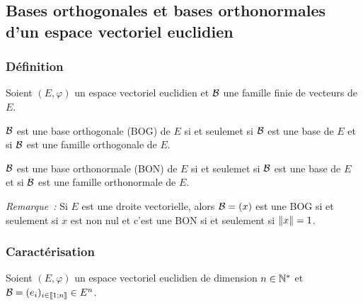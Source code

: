 \subsection{Bases orthogonales et bases orthonormales d'un espace vectoriel euclidien}

\subsubsection{Définition}

Soient \((E,\varphi)\) un espace vectoriel euclidien et \(\mathcal{B}\) une famille finie de vecteurs de \(E\).
\begin{defdef}
  \(\mathcal{B}\) est une base orthogonale (BOG) de \(E\) si et seulemet si \(\mathcal{B}\) est une base de \(E\) et si \(\mathcal{B}\) est une famille orthogonale de \(E\).

  \(\mathcal{B}\) est une base orthonormale (BON) de \(E\) si et seulemet si \(\mathcal{B}\) est une base de \(E\) et si \(\mathcal{B}\) est une famille orthonormale de \(E\).
\end{defdef}

\emph{Remarque~:} Si \(E\) est une droite vectorielle, alors \(\mathcal{B}=(x)\) est une BOG si et seulement si \(x\) est non nul et c'est une BON si et seulement si \(\left\lVert x\right\rVert=1\).

\subsubsection{Caractérisation}

Soient \((E,\varphi)\) un espace vectoriel euclidien de dimension \(n\in \mathbb{N}^*\) et \(\mathcal{B}=(e_i)_{i \in \mathopen{\llbracket}1\mathclose{}\mathpunct{};n\mathclose{\rrbracket}} \in E^n\).

